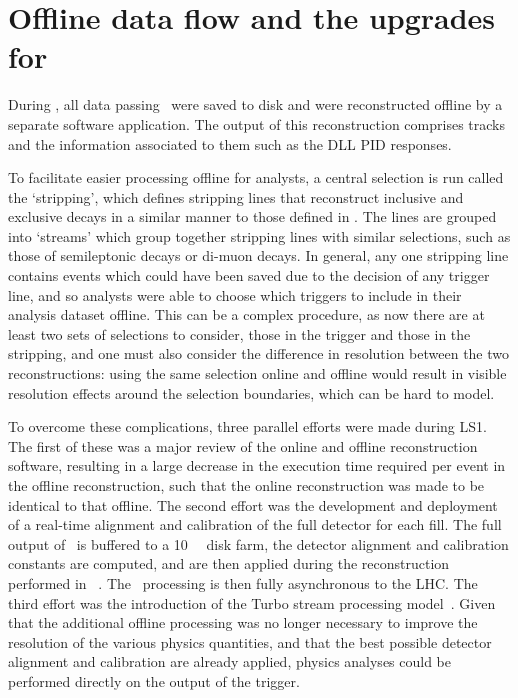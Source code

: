 \section{Offline data flow and the upgrades for \runtwo}
\label{chap:intro:lhcb:offline}

During \runone, all data passing \hlttwo\ were saved to disk and were 
reconstructed offline by a separate software application.
The output of this reconstruction comprises tracks and the information 
associated to them such as the \ac{DLL} \ac{PID} responses.

To facilitate easier processing offline for analysts, a central selection is 
run called the `stripping', which defines stripping lines that reconstruct 
inclusive and exclusive decays in a similar manner to those defined in \hlttwo.
The lines are grouped into `streams' which group together stripping lines with 
similar selections, such as those of semileptonic \PB decays or di-muon decays.
In general, any one stripping line contains events which could have been saved 
due to the decision of any trigger line, and so analysts were able to choose 
which triggers to include in their analysis dataset offline.
This can be a complex procedure, as now there are at least two sets of 
selections to consider, those in the trigger and those in the stripping, and 
one must also consider the difference in resolution between the two 
reconstructions: using the same selection online and offline would result in 
visible resolution effects around the selection boundaries, which can be hard 
to model.

To overcome these complications, three parallel efforts were made during 
\ac{LS1}.
The first of these was a major review of the online and offline reconstruction 
software, resulting in a large decrease in the execution time required per 
event in the offline reconstruction, such that the online reconstruction was 
made to be identical to that offline.
The second effort was the development and deployment of a real-time alignment 
and calibration of the full detector for each fill.
The full output of \hltone\ is buffered to a \SI{10}{\peta\byte} disk farm, the 
detector alignment and calibration constants are computed, and are then applied 
during the reconstruction performed in \hlttwo~\cite{Dujany:082010}.
The \hlttwo\ processing is then fully asynchronous to the \ac{LHC}.
The third effort was the introduction of the Turbo stream processing 
model~\cite{Benson:2019752}.
Given that the additional offline processing was no longer necessary to improve 
the resolution of the various physics quantities, and that the best possible 
detector alignment and calibration are already applied, physics analyses could 
be performed directly on the output of the trigger.

